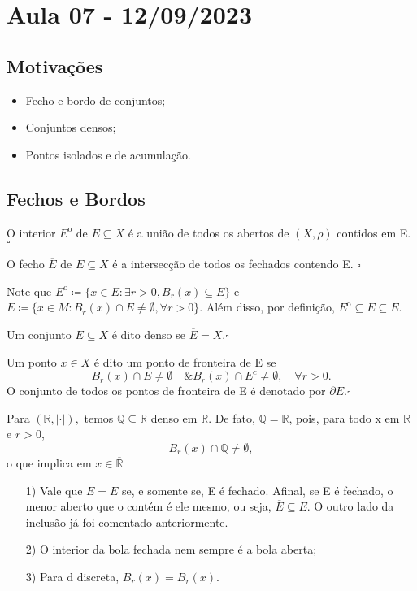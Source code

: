 \documentclass[metric_notes.tex]{subfiles}
\begin{document}
\section{Aula 07 - 12/09/2023}
\subsection{Motivações}
\begin{itemize}
	\item Fecho e bordo de conjuntos;
	\item Conjuntos densos;
	\item Pontos isolados e de acumulação.
\end{itemize}
\subsection{Fechos e Bordos}
\begin{def*}
	O interior \({E}^{\mathrm{o}}\) de \(E\subseteq{X}\) é a união de todos os abertos de \((X, \rho )\) contidos em E. \(\square\)
\end{def*}
\begin{def*}
	O fecho \(\overline{E}\) de \(E\subseteq{X}\) é a intersecção de todos os fechados contendo E. \(\square\)
\end{def*}
Note que \({E}^{\mathrm{o}}\coloneqq \{x\in E: \exists r > 0, B_{r}(x)\subseteq{E}\}\) e \(\overline{E}\coloneqq \{x\in M: B_{r}(x)\cap E \neq\emptyset, \forall r>0\}\).
Além disso, por definição, \({E}^{\mathrm{o}}\subseteq{E}\subseteq{\overline{E}}\).
\begin{def*}
	Um conjunto \(E\subseteq{X}\) é dito denso se \(\overline{E}=X.\square\)
\end{def*}
\begin{def*}
	Um ponto \(x\in X\) é dito um ponto de fronteira de E se
	\[
		B_{r}(x)\cap E \neq\emptyset\quad\& B_{r}(x)\cap E^{c}\neq\emptyset,\quad \forall r>0.
	\]
	O conjunto de todos os pontos de fronteira de E é denotado por \(\partial E.\square\)
\end{def*}
\begin{example}
	Para \((\mathbb{R}, |\cdot |),\) temos \(\mathbb{Q}\subseteq{\mathbb{R}}\) denso em \(\mathbb{R}\).
	De fato, \(\mathbb{Q}=\mathbb{R}\), pois, para todo x em \(\mathbb{R}\) e \(r > 0\),
	\[
		B_{r}(x)\cap \mathbb{Q}\neq\emptyset,
	\]
	o que implica em \(x\in \overline{\mathbb{R}}\)
\end{example}
\begin{example}
	\begin{itemize}
		\item[1)] Vale que \(E = \overline{E}\) se, e somente se, E é fechado. Afinal, se E é fechado, o menor aberto
		      que o contém é ele mesmo, ou seja, \(\overline{E}\subseteq{E}\). O outro lado da inclusão já foi comentado anteriormente.
		\item[2)] O interior da bola fechada nem sempre é a bola aberta;
		\item[3)] Para d discreta, \(B_{r}(x) = \overline{B_{r}}(x).\)
	\end{itemize}
\end{example}
\end{document}
